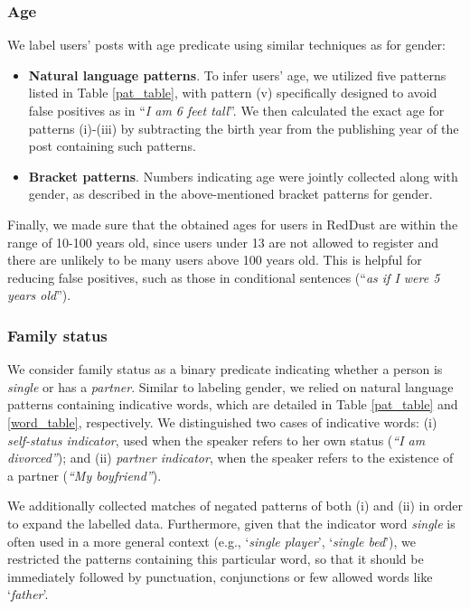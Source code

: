\subsubsection{Age}
We label users' posts with age predicate using similar techniques as for gender:

\begin{itemize}
    \item \textbf{Natural language patterns}.
    To infer users' age, we utilized five patterns listed in Table \ref{pat_table}, with pattern (v) specifically designed to avoid false positives as in ``\textit{I am 6 feet tall}''.
    We then calculated the exact age for patterns (i)-(iii) by subtracting the birth year from the publishing year of the post containing such patterns.

    \item \textbf{Bracket patterns}.
    Numbers indicating age were jointly collected along with gender, as described in the above-mentioned bracket patterns for gender.
\end{itemize}

Finally, we made sure that the obtained ages for users in RedDust are within the range of 10-100 years old, since users under 13 are not allowed to register and there are unlikely to be many users above 100 years old.
This is helpful for reducing false positives, such as those in conditional sentences (``\textit{as if I were 5 years old}'').

\subsubsection{Family status}

We consider family status as a binary predicate indicating whether a person is \emph{single} or has a \emph{partner}. Similar to labeling gender, we relied on natural language patterns containing indicative words, which are detailed in Table \ref{pat_table} and \ref{word_table}, respectively. We distinguished two cases of indicative words: (i) \textit{{self-status indicator}}, used when the speaker refers to her own status (\emph{``I am divorced''}); and (ii) \textit{{partner indicator}}, when the speaker refers to the existence of a partner (\emph{``My boyfriend''}).

We additionally collected matches of negated patterns of both (i) and (ii)
in order to expand the labelled data. Furthermore, given that the indicator word \emph{single} is often used in a more general context (e.g., `\emph{single player}', `\emph{single bed}'), we restricted the patterns containing this particular word, so that it should be immediately followed by punctuation, conjunctions or few allowed words like `\emph{father}'.

